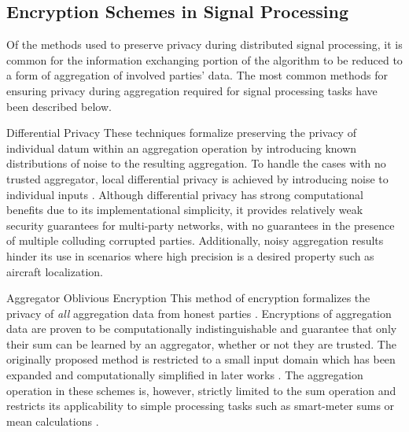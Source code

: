 \documentclass[10pt,letterpaper,oneside,twocolumn,journal]{IEEEtran}
\theoremstyle{definition}
\theoremstyle{definition}
\theoremstyle{remark}
\begin{document}
\subsection{Encryption Schemes in Signal Processing}
Of the methods used to preserve privacy during distributed signal processing, it is common for the information exchanging portion of the algorithm to be reduced to a form of aggregation of involved parties' data. The most common methods for ensuring privacy during aggregation required for signal processing tasks have been described below.
\begin{LaTeXdescription}
    \item[Differential Privacy] These techniques formalize preserving the privacy of individual datum within an aggregation operation by introducing known distributions of noise to the resulting aggregation. To handle the cases with no trusted aggregator, local differential privacy is achieved by introducing noise to individual inputs \cite{hanPrivacyControlDynamical2018,dworkDifferentialPrivacySurvey2008,andresGeoindistinguishabilityDifferentialPrivacy2013}. Although differential privacy has strong computational benefits due to its implementational simplicity, it provides relatively weak security guarantees for multi-party networks, with no guarantees in the presence of multiple colluding corrupted parties. Additionally, noisy aggregation results hinder its use in scenarios where high precision is a desired property such as aircraft localization.
    \item[Aggregator Oblivious Encryption] This method of encryption formalizes the privacy of \textit{all} aggregation data from honest parties \cite{shiPrivacyPreservingAggregationTimeSeries2011,chanPrivacyPreservingStreamAggregation2012,joyeScalableSchemePrivacyPreserving2013}. Encryptions of aggregation data are proven to be computationally indistinguishable and guarantee that only their sum can be learned by an aggregator, whether or not they are trusted. The originally proposed method \cite{shiPrivacyPreservingAggregationTimeSeries2011} is restricted to a small input domain which has been expanded and computationally simplified in later works \cite{joyeScalableSchemePrivacyPreserving2013,benhamoudaNewFrameworkPrivacyPreserving2016}. The aggregation operation in these schemes is, however, strictly limited to the sum operation and restricts its applicability to simple processing tasks such as smart-meter sums or mean calculations \cite{chanPrivacyPreservingStreamAggregation2012,benhamoudaNewFrameworkPrivacyPreserving2016}.
\end{LaTeXdescription}
\end{document}
